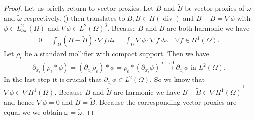 \documentclass[12pt,a4paper]{article}
\theoremstyle{definition}
\DeclareMathOperator{\diver}{div}
\newcommand{\rop}{\mathscr{R}} %
\begin{document}
\begin{proof}
    Let us briefly return to vector proxies. Let $B$ and $\tilde{B}$ be 
    vector proxies of $\omega$ and $\tilde{\omega}$ respectively. 
    () then translates to 
    $B, \tilde{B} \in \mathring{H}(\diver)$ %
    and $B-\tilde{B} = \nabla \phi$ with $\phi \in L^2_{loc}(\Omega)$ and
    $\nabla \phi \in L^2(\Omega)^3$.
    Because $B$ and $\tilde{B}$ are both harmonic we have 
    \begin{align*}
        0 = \int_\Omega (B-\tilde{B}) \cdot \nabla f\, dx 
        = \int_\Omega \nabla \phi \cdot \nabla f \,dx
        \quad \forall 
        f \in H^1(\Omega).
    \end{align*}
    Let $\rho_\epsilon$ be a standard mollifier with compact support. 
    Then we have 
    \begin{align*}
        \partial_{x_i} (\rho_\epsilon * \phi) = 
        (\partial_{x_i} \rho_\epsilon) * \phi = 
        \rho_\epsilon * (\partial_{x_i} \phi) 
        \xrightarrow{\epsilon \rightarrow 0} 
        \partial_{x_i} \phi \text{ in $L^2(\Omega)$}.
    \end{align*}
    In the last step it is crucial that $\partial_{x_i} \phi \in L^2(\Omega)$.
    So we know that $\nabla \phi \in \overline{\nabla H^1(\Omega)}$. 
    Because $B$ and $\tilde{B}$ are harmonic we have 
    $B - \tilde{B} \in 
    \overline{\nabla H^1(\Omega)}^\perp$ and hence $\nabla \phi = 0$
    and $B = \tilde{B}$. Because the corresponding vector proxies are equal we 
    we obtain $\omega = \tilde{\omega}$.
\end{proof}



    
\end{document}
